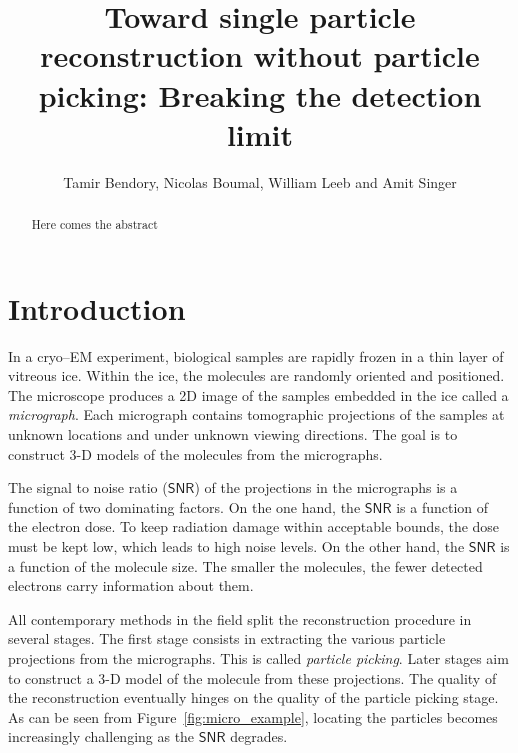 \documentclass[english,11pt]{article}
\newcommand{\1}{\mathbf{1}}
\newcommand{\TODO}[1]{{\color{red}{[#1]}}}
\numberwithin{equation}{section}
\theoremstyle{plain}
\theoremstyle{definition}
\theoremstyle{remark}
\theoremstyle{plain}
\theoremstyle{remark}
\theoremstyle{plain}
\theoremstyle{plain}
\newcommand{\SNR}{\ensuremath{\textsf{SNR}}}
\begin{document}
\title{Toward single particle reconstruction without particle picking: Breaking the detection limit}


\author{Tamir Bendory, Nicolas Boumal, William Leeb and Amit Singer}
\maketitle

\begin{abstract}
	Here comes the abstract
\end{abstract}

\section{Introduction}

\TODO{Revise--Cryo--electron microscopy (cryo--EM) is an innovative technology for single particle reconstruction (SPR) of macromolecules.} 
% 
In a cryo--EM experiment, biological samples are rapidly frozen in a thin layer of vitreous ice. Within the ice, the molecules are randomly oriented and positioned. The microscope produces a 2D image of the samples embedded in the ice called a \emph{micrograph}. Each micrograph contains tomographic projections of the samples at unknown locations and under unknown viewing directions. The goal is to construct 3-D models of the molecules from the micrographs.

The signal to noise ratio ($\SNR$) of the projections in the micrographs is a function of two dominating factors. On the one hand, the $\SNR$ is a function of the electron dose. To keep radiation damage within acceptable bounds, the dose must be kept low, which leads to high noise levels. On the other hand, the $\SNR$ is a function of the molecule size. The smaller the molecules, the fewer detected electrons carry information about them.

All contemporary methods in the field split the reconstruction procedure in several stages.
The first stage consists in extracting the various particle projections from the micrographs. This is called \emph{particle picking}. Later stages aim to construct a 3-D model of the molecule from these projections. The quality of the reconstruction eventually hinges on the quality of the particle picking stage. As can be seen from Figure~\ref{fig:micro_example}, locating the particles becomes increasingly challenging as the $\SNR$ degrades.
\end{document}

